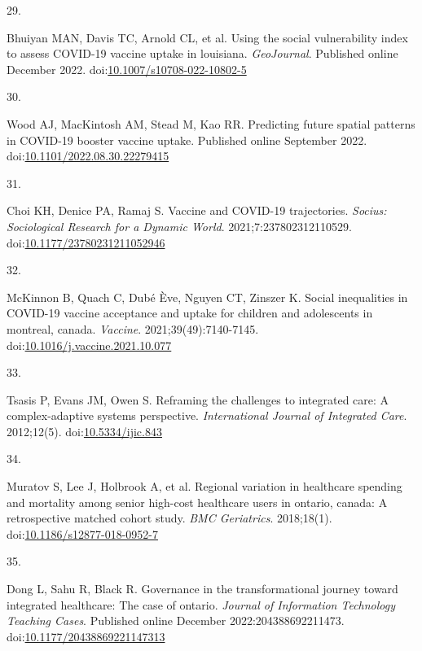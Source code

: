 \documentclass[
  letterpaper,
  DIV=11,
  numbers=noendperiod]{scrartcl}
\newlength{\cslhangindent}
\newlength{\csllabelwidth}
\newlength{\cslentryspacingunit} %
\newenvironment{CSLReferences}[2] %
 {%
  \setlength{\parindent}{0pt}
  \ifodd #1
  \let\oldpar\par
  \def\par{\hangindent=\cslhangindent\oldpar}
  \fi
  \setlength{\parskip}{#2\cslentryspacingunit}
 }%
 {}
\newcommand{\CSLLeftMargin}[1]{\parbox[t]{\csllabelwidth}{#1}}
\newcommand{\CSLRightInline}[1]{\parbox[t]{\linewidth - \csllabelwidth}{#1}\break}
\begin{document}
\begin{CSLReferences}{0}{0}
\leavevmode{}%
\CSLLeftMargin{29. }%
\CSLRightInline{Bhuiyan MAN, Davis TC, Arnold CL, et al. Using the
social vulnerability index to assess {COVID}-19 vaccine uptake in
louisiana. \emph{{GeoJournal}}. Published online December 2022.
doi:\href{https://doi.org/10.1007/s10708-022-10802-5}{10.1007/s10708-022-10802-5}}

\leavevmode{}%
\CSLLeftMargin{30. }%
\CSLRightInline{Wood AJ, MacKintosh AM, Stead M, Kao RR. Predicting
future spatial patterns in {COVID}-19 booster vaccine uptake. Published
online September 2022.
doi:\href{https://doi.org/10.1101/2022.08.30.22279415}{10.1101/2022.08.30.22279415}}

\leavevmode{}%
\CSLLeftMargin{31. }%
\CSLRightInline{Choi KH, Denice PA, Ramaj S. Vaccine and {COVID}-19
trajectories. \emph{Socius: Sociological Research for a Dynamic World}.
2021;7:237802312110529.
doi:\href{https://doi.org/10.1177/23780231211052946}{10.1177/23780231211052946}}

\leavevmode{}%
\CSLLeftMargin{32. }%
\CSLRightInline{McKinnon B, Quach C, Dubé Ève, Nguyen CT, Zinszer K.
Social inequalities in {COVID}-19 vaccine acceptance and uptake for
children and adolescents in montreal, canada. \emph{Vaccine}.
2021;39(49):7140-7145.
doi:\href{https://doi.org/10.1016/j.vaccine.2021.10.077}{10.1016/j.vaccine.2021.10.077}}

\leavevmode{}%
\CSLLeftMargin{33. }%
\CSLRightInline{Tsasis P, Evans JM, Owen S. Reframing the challenges to
integrated care: A complex-adaptive systems perspective.
\emph{International Journal of Integrated Care}. 2012;12(5).
doi:\href{https://doi.org/10.5334/ijic.843}{10.5334/ijic.843}}

\leavevmode{}%
\CSLLeftMargin{34. }%
\CSLRightInline{Muratov S, Lee J, Holbrook A, et al. Regional variation
in healthcare spending and mortality among senior high-cost healthcare
users in ontario, canada: A retrospective matched cohort study.
\emph{{BMC} Geriatrics}. 2018;18(1).
doi:\href{https://doi.org/10.1186/s12877-018-0952-7}{10.1186/s12877-018-0952-7}}

\leavevmode{}%
\CSLLeftMargin{35. }%
\CSLRightInline{Dong L, Sahu R, Black R. Governance in the
transformational journey toward integrated healthcare: The case of
ontario. \emph{Journal of Information Technology Teaching Cases}.
Published online December 2022:204388692211473.
doi:\href{https://doi.org/10.1177/20438869221147313}{10.1177/20438869221147313}}


\end{CSLReferences}
\end{document}
